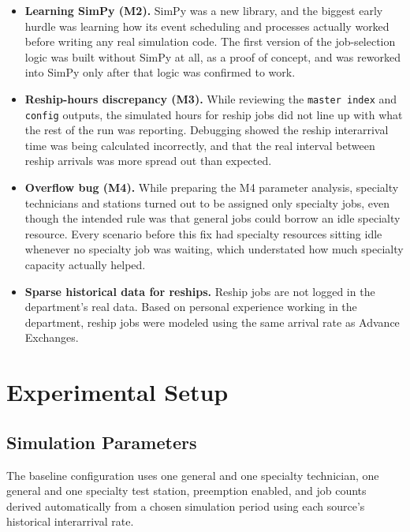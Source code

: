 \documentclass[12pt, letterpaper, twoside]{article}
\begin{document}
\begin{itemize}
    \item \textbf{Learning SimPy (M2).} SimPy was a new library, and the biggest early
    hurdle was learning how its event scheduling and processes actually worked before
    writing any real simulation code. The first version of the job-selection logic was
    built without SimPy at all, as a proof of concept, and was reworked into SimPy only
    after that logic was confirmed to work.

    \item \textbf{Reship-hours discrepancy (M3).} While reviewing the \texttt{master
    index} and \texttt{config} outputs, the simulated hours for reship jobs
    did not line up with what the rest of the run was reporting. Debugging showed the reship interarrival time was being calculated incorrectly, and
    that the real interval between reship arrivals was more spread out than expected.

    \item \textbf{Overflow bug (M4).} While preparing the M4 parameter
    analysis, specialty technicians and stations turned out to be assigned only specialty
    jobs, even though the intended rule was that general jobs could borrow an idle
    specialty resource. Every scenario before this fix had specialty resources sitting
    idle whenever no specialty job was waiting, which understated how much specialty
    capacity actually helped.

    \item \textbf{Sparse historical data for reships.} Reship jobs are not logged in the
    department's real data. Based on personal experience working in the department,
    reship jobs were modeled using the same arrival rate as Advance Exchanges.
\end{itemize}

\section{Experimental Setup}
\label{sec:setup}

\subsection{Simulation Parameters}

The baseline configuration uses one general and one specialty technician, one general and
one specialty test station, preemption enabled, and job counts derived automatically from
a chosen simulation period using each source's historical interarrival rate.
\end{document}
